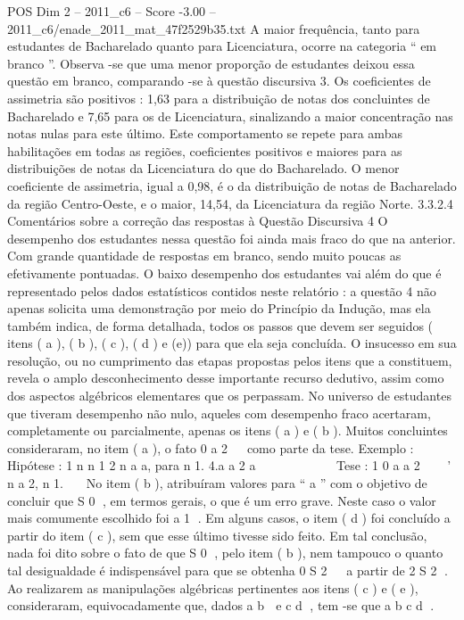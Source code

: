 \begin{textsample}{POS Dim 2 – 2011\_c6 – Score -3.00 – 2011\_c6/enade\_2011\_mat\_47f2529b35.txt}
A maior frequência, tanto para estudantes de Bacharelado quanto para Licenciatura, ocorre na categoria “ em branco ”.
Observa -se que uma menor proporção de estudantes deixou essa questão em branco, comparando -se à questão discursiva 3.
Os coeficientes de assimetria são positivos : 1,63 para a distribuição de notas dos concluintes de Bacharelado e 7,65 para os de Licenciatura, sinalizando a maior concentração nas notas nulas para este último.
Este comportamento se repete para ambas habilitações em todas as regiões, coeficientes positivos e maiores para as distribuições de notas da Licenciatura do que do Bacharelado.
O menor coeficiente de assimetria, igual a 0,98, é o da distribuição de notas de Bacharelado da região Centro-Oeste, e o maior, 14,54, da Licenciatura da região Norte. 3.3.2.4 Comentários sobre a correção das respostas à Questão Discursiva 4 O desempenho dos estudantes nessa questão foi ainda mais fraco do que na anterior.
Com grande quantidade de respostas em branco, sendo muito poucas as efetivamente pontuadas.
O baixo desempenho dos estudantes vai além do que é representado pelos dados estatísticos contidos neste relatório : a questão 4 não apenas solicita uma demonstração por meio do Princípio da Indução, mas ela também indica, de forma detalhada, todos os passos que devem ser seguidos ( itens ( a ), ( b ), ( c ), ( d ) e (e)) para que ela seja concluída.
O insucesso em sua resolução, ou no cumprimento das etapas propostas pelos itens que a constituem, revela o amplo desconhecimento desse importante recurso dedutivo, assim como dos aspectos algébricos elementares que os perpassam.
No universo de estudantes que tiveram desempenho não nulo, aqueles com desempenho fraco acertaram, completamente ou parcialmente, apenas os itens ( a ) e ( b ).
Muitos concluintes consideraram, no item ( a ), o fato 0 a 2   como parte da tese.
Exemplo : Hipótese : 1 n n 1 2 n a a, para n 1. 4.a a 2 a           Tese : 1 0 a a 2    ' n a 2, n 1.   No item ( b ), atribuíram valores para “ a ” com o objetivo de concluir que S 0 , em termos gerais, o que é um erro grave.
Neste caso o valor mais comumente escolhido foi a 1 .
Em alguns casos, o item ( d ) foi concluído a partir do item ( c ), sem que esse último tivesse sido feito.
Em tal conclusão, nada foi dito sobre o fato de que S 0 , pelo item ( b ), nem tampouco o quanto tal desigualdade é indispensável para que se obtenha 0 S 2   a partir de 2 S 2 .
Ao realizarem as manipulações algébricas pertinentes aos itens ( c ) e ( e ), consideraram, equivocadamente que, dados a b  e c d , tem -se que a b c d .

\end{textsample}
